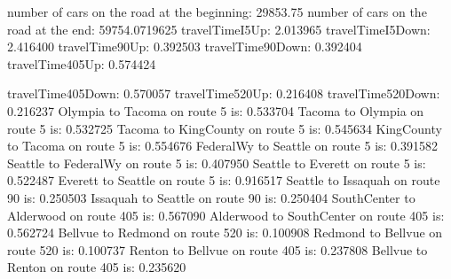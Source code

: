 number of cars on the road at the beginning:
29853.75
number of cars on the road at the end:
59754.0719625
travelTimeI5Up: 2.013965
travelTimeI5Down: 2.416400
travelTime90Up: 0.392503
travelTime90Down: 0.392404
travelTime405Up: 0.574424

travelTime405Down: 0.570057
travelTime520Up: 0.216408
travelTime520Down: 0.216237
Olympia to Tacoma on route 5 is: 0.533704
Tacoma to Olympia on route 5 is: 0.532725
Tacoma to KingCounty on route 5 is: 0.545634
KingCounty to Tacoma on route 5 is: 0.554676
FederalWy to Seattle on route 5 is: 0.391582
Seattle to FederalWy on route 5 is: 0.407950
Seattle to Everett on route 5 is: 0.522487
Everett to Seattle on route 5 is: 0.916517
Seattle to Issaquah on route 90 is: 0.250503
Issaquah to Seattle on route 90 is: 0.250404
SouthCenter to Alderwood on route 405 is: 0.567090
Alderwood to SouthCenter on route 405 is: 0.562724
Bellvue to Redmond on route 520 is: 0.100908
Redmond to Bellvue on route 520 is: 0.100737
Renton to Bellvue on route 405 is: 0.237808
Bellvue to Renton on route 405 is: 0.235620